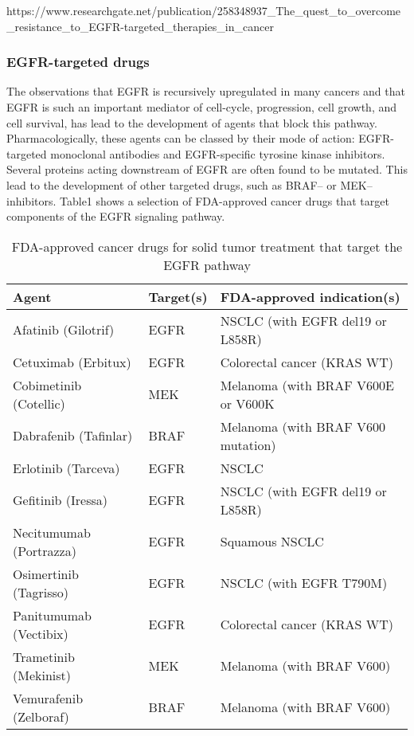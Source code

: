 {{{        https://www.researchgate.net/publication/258348937_The_quest_to_overcome_resistance_to_EGFR-targeted_therapies_in_cancer

    \subsubsection{EGFR-targeted drugs}

      The observations that EGFR is recursively upregulated in many cancers
      and that EGFR is such an important mediator of cell-cycle,
      progression, cell growth, and cell survival, has lead to the
      development of agents that block this pathway. Pharmacologically,
      these agents can be classed by their mode of action: EGFR-targeted
      monoclonal antibodies and EGFR-specific tyrosine kinase inhibitors.
      Several proteins acting downstream of EGFR are often
      found to be mutated. This lead to the development of other targeted
      drugs, such as BRAF-- or MEK--inhibitors. Table1 shows a selection
      of FDA-approved cancer drugs that target components of the EGFR signaling
      pathway.

      \begin{table}[!htbp]
          \caption[Targeted Cancer Agents]{FDA-approved cancer drugs for solid tumor treatment that target the EGFR pathway}
          \centering
          \begin{tabular}{ |p{4cm}|p{3.7cm}|p{6.3cm}|}
          \hline
          Agent & Target(s) & FDA-approved indication(s) \\ \hline \hline
          Afatinib (Gilotrif) & EGFR & NSCLC (with EGFR del19 or L858R) \\
          Cetuximab (Erbitux) & EGFR & Colorectal cancer (KRAS WT) \\
          Cobimetinib (Cotellic) & MEK & Melanoma (with BRAF V600E or V600K \\
          Dabrafenib (Tafinlar) & BRAF & Melanoma (with BRAF V600 mutation) \\
          Erlotinib (Tarceva) & EGFR & NSCLC \\
          Gefitinib (Iressa) & EGFR & NSCLC (with EGFR del19 or L858R) \\
          Necitumumab (Portrazza) & EGFR & Squamous NSCLC \\
          Osimertinib (Tagrisso) & EGFR & NSCLC (with EGFR T790M) \\
          Panitumumab (Vectibix) & EGFR & Colorectal cancer (KRAS WT) \\
          Trametinib (Mekinist) & MEK & Melanoma (with BRAF V600) \\
          Vemurafenib (Zelboraf) & BRAF & Melanoma (with BRAF V600) \\
          \hline
        \end{tabular}
      \end{table}

}}}
